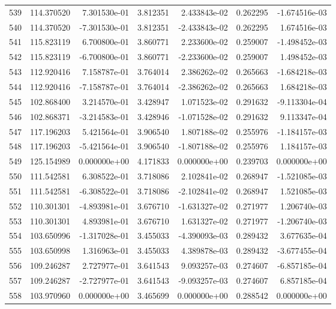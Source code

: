 \begin{tabular}{rrrrrrr}
 539 & 114.370520 &  7.301530e-01 &  3.812351 &  2.433843e-02 &    0.262295 & -1.674516e-03 \\
 540 & 114.370520 & -7.301530e-01 &  3.812351 & -2.433843e-02 &    0.262295 &  1.674516e-03 \\
 541 & 115.823119 &  6.700800e-01 &  3.860771 &  2.233600e-02 &    0.259007 & -1.498452e-03 \\
 542 & 115.823119 & -6.700800e-01 &  3.860771 & -2.233600e-02 &    0.259007 &  1.498452e-03 \\
 543 & 112.920416 &  7.158787e-01 &  3.764014 &  2.386262e-02 &    0.265663 & -1.684218e-03 \\
 544 & 112.920416 & -7.158787e-01 &  3.764014 & -2.386262e-02 &    0.265663 &  1.684218e-03 \\
 545 & 102.868400 &  3.214570e-01 &  3.428947 &  1.071523e-02 &    0.291632 & -9.113304e-04 \\
 546 & 102.868371 & -3.214583e-01 &  3.428946 & -1.071528e-02 &    0.291632 &  9.113347e-04 \\
 547 & 117.196203 &  5.421564e-01 &  3.906540 &  1.807188e-02 &    0.255976 & -1.184157e-03 \\
 548 & 117.196203 & -5.421564e-01 &  3.906540 & -1.807188e-02 &    0.255976 &  1.184157e-03 \\
 549 & 125.154989 &  0.000000e+00 &  4.171833 &  0.000000e+00 &    0.239703 &  0.000000e+00 \\
 550 & 111.542581 &  6.308522e-01 &  3.718086 &  2.102841e-02 &    0.268947 & -1.521085e-03 \\
 551 & 111.542581 & -6.308522e-01 &  3.718086 & -2.102841e-02 &    0.268947 &  1.521085e-03 \\
 552 & 110.301301 & -4.893981e-01 &  3.676710 & -1.631327e-02 &    0.271977 &  1.206740e-03 \\
 553 & 110.301301 &  4.893981e-01 &  3.676710 &  1.631327e-02 &    0.271977 & -1.206740e-03 \\
 554 & 103.650996 & -1.317028e-01 &  3.455033 & -4.390093e-03 &    0.289432 &  3.677635e-04 \\
 555 & 103.650998 &  1.316963e-01 &  3.455033 &  4.389878e-03 &    0.289432 & -3.677455e-04 \\
 556 & 109.246287 &  2.727977e-01 &  3.641543 &  9.093257e-03 &    0.274607 & -6.857185e-04 \\
 557 & 109.246287 & -2.727977e-01 &  3.641543 & -9.093257e-03 &    0.274607 &  6.857185e-04 \\
 558 & 103.970960 &  0.000000e+00 &  3.465699 &  0.000000e+00 &    0.288542 &  0.000000e+00 \\

\end{tabular}
